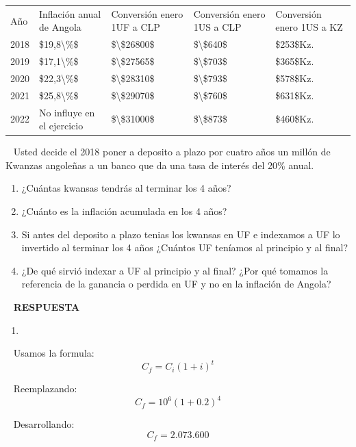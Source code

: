 \documentclass[
  letterpaper,
  DIV=11,
  numbers=noendperiod]{scrreport}
\providecommand{\tightlist}{%
  \setlength{\itemsep}{0pt}\setlength{\parskip}{0pt}}\usepackage{longtable,booktabs,array}
\begin{document}
\begin{longtable}[]{@{}lllll@{}}
\toprule\noalign{}
\endhead
\bottomrule\noalign{}
\endlastfoot
Año & Inflación anual de Angola & Conversión enero 1UF a CLP &
Conversión enero 1US a CLP & Conversión enero 1US a KZ \\
2018 & \$19,8\textbackslash\%\$ & \$\textbackslash\$26800\$ &
\$\textbackslash\$640\$ & \$253\$Kz. \\
2019 & \$17,1\textbackslash\%\$ & \$\textbackslash\$27565\$ &
\$\textbackslash\$703\$ & \$365\$Kz. \\
2020 & \$22,3\textbackslash\%\$ & \$\textbackslash\$28310\$ &
\$\textbackslash\$793\$ & \$578\$Kz. \\
2021 & \$25,8\textbackslash\%\$ & \$\textbackslash\$29070\$ &
\$\textbackslash\$760\$ & \$631\$Kz. \\
2022 & No influye en el ejercicio & \$\textbackslash\$31000\$ &
\$\textbackslash\$873\$ & \$460\$Kz. \\
\end{longtable}

~ Usted decide el 2018 poner a deposito a plazo por cuatro años un
millón de Kwanzas angoleñas a un banco que da una tasa de interés del
20\% anual.

\begin{enumerate}
\def\labelenumi{\arabic{enumi})}
\item
  ¿Cuántas kwansas tendrás al terminar los 4 años?
\item
  ¿Cuánto es la inflación acumulada en los 4 años?
\item
  Si antes del deposito a plazo tenias los kwansas en UF e indexamos a
  UF lo invertido al terminar los 4 años ¿Cuántos UF teníamos al
  principio y al final?
\item
  ¿De qué sirvió indexar a UF al principio y al final? ¿Por qué tomamos
  la referencia de la ganancia o perdida en UF y no en la inflación de
  Angola?
\end{enumerate}

~ \textbf{RESPUESTA}

\begin{enumerate}
\def\labelenumi{\arabic{enumi})}
\tightlist
\item
\end{enumerate}

~ Usamos la formula: \[
C_f=C_i(1+i)^t
\]

~ Reemplazando: \[
C_f=10^6(1+0.2)^4
\]

~ Desarrollando: \[
C_f=\text{$2$.$073$.$600$}
\]
\end{document}
